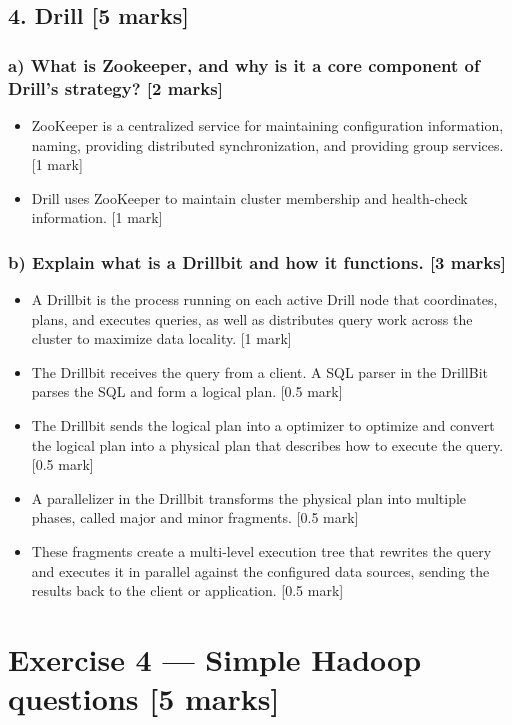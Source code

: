\documentclass[11pt,a4paper]{article}
\begin{document}
\subsection*{4. Drill [5 marks]}

\subsubsection*{a) What is Zookeeper, and why is it a core component of Drill’s strategy? [2 marks]}

\begin{itemize}
\item ZooKeeper is a centralized service for maintaining configuration information, naming, providing distributed synchronization, and providing group services. [1 mark]
\item Drill uses ZooKeeper to maintain cluster membership and health-check information. [1 mark]
\end{itemize}

\subsubsection*{b) Explain what is a Drillbit and how it functions. [3 marks]}

\begin{itemize}
\item A Drillbit is the process running on each active Drill node that coordinates, plans, and executes queries, as well as distributes query work across the cluster to maximize data locality. [1 mark]
\item The Drillbit receives the query from a client. A SQL parser in the DrillBit parses the SQL and form a logical plan. [0.5 mark]
\item The Drillbit sends the logical plan into a optimizer to optimize and convert the logical plan into a physical plan that describes how to execute the query. [0.5 mark]
\item A parallelizer in the Drillbit transforms the physical plan into multiple phases, called major and minor fragments.  [0.5 mark]
\item These fragments create a multi-level execution tree that rewrites the query and executes it in parallel against the configured data sources, sending the results back to the client or application. [0.5 mark]
\end{itemize}

\section*{Exercise 4 --- Simple Hadoop questions [5 marks]}
\end{document}
